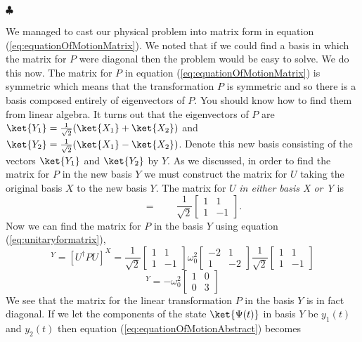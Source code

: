 \begin{flushleft}$\clubsuit$\end{flushleft}
We managed to cast our physical problem into matrix form in equation (\ref{eq:equationOfMotionMatrix}).  We noted that if we could find a basis in which the matrix for $P$ were diagonal then the problem would be easy to solve.  We do this now.  The matrix for $P$ in equation (\ref{eq:equationOfMotionMatrix}) is symmetric which means that the transformation $P$ is symmetric and so there is a basis composed entirely of eigenvectors of $P$.  You should know how to find them from linear algebra.  It turns out that the eigenvectors of $P$ are \mbox{$\ket{Y_1} = \frac{1}{\sqrt{2}}(\ket{X_1}+\ket{X_2})$} and \mbox{$\ket{Y_2} = \frac{1}{\sqrt{2}}(\ket{X_1}-\ket{X_2})$}.  Denote this new basis consisting of the vectors $\ket{Y_1}$ and $\ket{Y_2}$ by $Y$.  As we discussed, in order to find the matrix for $P$ in the new basis $Y$ we must construct the matrix for $U$ taking the original basis $X$ to the new basis $Y$.  The matrix for $U$ \emph{in either basis X or Y} is
\begin{displaymath} [U] \qquad = \qquad \frac{1}{\sqrt{2}}\left[ \begin{array}{cc} 1&1 \\ 1&-1 \end{array} \right]. \end{displaymath}
Now we can find the matrix for $P$ in the basis $Y$ using equation (\ref{eq:unitaryformatrix}),
\begin{displaymath} [P]^{Y} = [U^{\dag}PU]^{X} = 
\frac{1}{\sqrt{2}} \left[ \begin{array}{cc} 1&1 \\ 1&-1 \end{array} \right]
\omega _{0}^{2} \left[ \begin{array}{cc} -2&1 \\ 1&-2 \end{array} \right]
\frac{1}{\sqrt{2}} \left[ \begin{array}{cc} 1&1 \\ 1&-1 \end{array} \right]
\end{displaymath}
\begin{displaymath} [P]^Y = -\omega _{0}^{2} \left[ \begin{array}{cc} 1&0 \\ 0&3 \end{array} \right] \end{displaymath}
We see that the matrix for the linear transformation $P$ in the basis $Y$ is in fact diagonal.  If we let the components of the state $\ket{\Psi (t)}$ in basis $Y$ be $y_1(t)$ and $y_2(t)$ then equation (\ref{eq:equationOfMotionAbstract}) becomes
